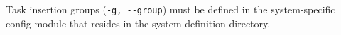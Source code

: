 Task insertion groups (\lstinline=-g, --group=) must be defined in the
system-specific config module that resides in the system definition 
directory.
